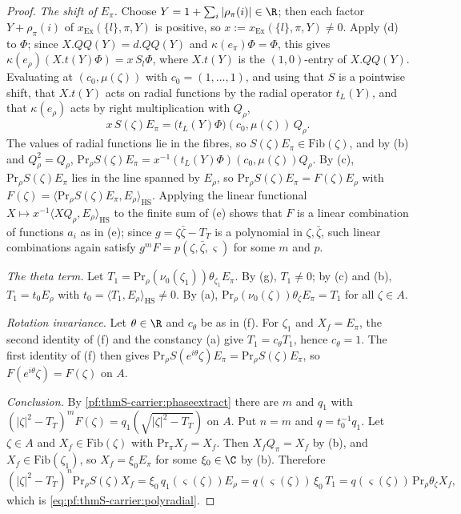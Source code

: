 \begin{proof}
\emph{The shift of $E_\pi$.} Choose $Y=1+\sum_i|\rho_\pi(i)|\in\R$; then each factor $Y+\rho_\pi(i)$ of
$x_{\mathrm{Ex}}(\{l\},\pi,Y)$ is positive, so $x:=x_{\mathrm{Ex}}(\{l\},\pi,Y)\ne0$. Apply (d) to $\Phi$; since
$X.QQ(Y)=d.QQ(Y)$ and $\kappa(e_\pi)\Phi=\Phi$, this gives $\kappa(e_\rho)(X.t(Y)\Phi)=x\,S_l\Phi$, where $X.t(Y)$ is the
$(1,0)$-entry of $X.QQ(Y)$. Evaluating at $(c_0,\mu(\zeta))$ with $c_0=(1,\dots,1)$, and using that $S$ is a pointwise shift,
that $X.t(Y)$ acts on radial functions by the radial operator $t_L(Y)$, and that $\kappa(e_\rho)$ acts by right
multiplication with $Q_\rho$,
\[
x\,S(\zeta)E_\pi=\bigl(t_L(Y)\Phi\bigr)(c_0,\mu(\zeta))\,Q_\rho .
\]
The values of radial functions lie in the fibres, so $S(\zeta)E_\pi\in\mathrm{Fib}(\zeta)$, and by (b) and $Q_\rho^2=Q_\rho$,
$\mathrm{Pr}_\rho S(\zeta)E_\pi=x^{-1}(t_L(Y)\Phi)(c_0,\mu(\zeta))Q_\rho$. By (c), $\mathrm{Pr}_\rho S(\zeta)E_\pi$ lies in the
line spanned by $E_\rho$, so $\mathrm{Pr}_\rho S(\zeta)E_\pi=F(\zeta)E_\rho$ with
$F(\zeta)=\langle\mathrm{Pr}_\rho S(\zeta)E_\pi,E_\rho\rangle_{\mathrm{HS}}$. Applying the linear functional
$X\mapsto x^{-1}\langle XQ_\rho,E_\rho\rangle_{\mathrm{HS}}$ to the finite sum of (e) shows that $F$ is a linear combination of
functions $a_i$ as in (e); since $g=\zeta\bar\zeta-T_T$ is a polynomial in $\zeta,\bar\zeta$, such linear combinations again
satisfy $g^mF=p(\zeta,\bar\zeta,\varsigma)$ for some $m$ and $p$.

\emph{The theta term.} Let $T_1=\mathrm{Pr}_\rho(\nu_0(\zeta_1))\theta_{\zeta_1}E_\pi$. By (g), $T_1\ne0$; by (c) and (b),
$T_1=t_0E_\rho$ with $t_0=\langle T_1,E_\rho\rangle_{\mathrm{HS}}\ne0$. By (a), $\mathrm{Pr}_\rho(\nu_0(\zeta))\theta_\zeta
E_\pi=T_1$ for all $\zeta\in A$.

\emph{Rotation invariance.} Let $\theta\in\R$ and $c_\theta$ be as in (f). For $\zeta_1$ and $X_f=E_\pi$, the second identity
of (f) and the constancy (a) give $T_1=c_\theta T_1$, hence $c_\theta=1$. The first identity of (f) then gives
$\mathrm{Pr}_\rho S(e^{i\theta}\zeta)E_\pi=\mathrm{Pr}_\rho S(\zeta)E_\pi$, so $F(e^{i\theta}\zeta)=F(\zeta)$ on $A$.

\emph{Conclusion.} By \cref{pf:thmS-carrier:phaseextract} there are $m$ and $q_1$ with $(|\zeta|^2-T_T)^mF(\zeta)=
q_1(\sqrt{|\zeta|^2-T_T})$ on $A$. Put $n=m$ and $q=t_0^{-1}q_1$. Let $\zeta\in A$ and $X_f\in\mathrm{Fib}(\zeta)$ with
$\mathrm{Pr}_\pi X_f=X_f$. Then $X_fQ_\pi=X_f$ by (b), and $X_f\in\mathrm{Fib}(\zeta_1)$, so $X_f=\xi_0E_\pi$ for some $\xi_0\in\C$ by
(b). Therefore
\[
(|\zeta|^2-T_T)^n\mathrm{Pr}_\rho S(\zeta)X_f=\xi_0\,q_1(\varsigma(\zeta))E_\rho=q(\varsigma(\zeta))\,\xi_0\,T_1
=q(\varsigma(\zeta))\,\mathrm{Pr}_\rho\theta_\zeta X_f,
\]
which is \eqref{eq:pf:thmS-carrier:polyradial}.
\end{proof}


